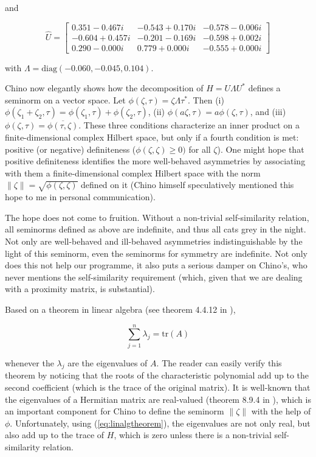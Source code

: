 \documentclass[11pt]{article}
\begin{document}
and

\begin{equation}
  \label{eq:dklu}
\hat{U}=\left[
      \begin{array}{ccc}
   0.351 - 0.467i & -0.543 + 0.170i & -0.578 - 0.006i \\
  -0.604 + 0.457i & -0.201 - 0.169i & -0.598 + 0.002i \\
   0.290 - 0.000i &  0.779 + 0.000i & -0.555 + 0.000i
      \end{array}
\right]
\end{equation}

with $\Lambda=\mbox{diag}(-0.060,-0.045,0.104)$. 

Chino now elegantly shows how the decomposition of $H=U\Lambda{}U^{*}$
defines a seminorm on a vector space. Let
$\phi(\zeta,\tau)=\zeta\Lambda\tau^{*}$. Then (i)
$\phi(\zeta_{1}+\zeta_{2},\tau)=\phi(\zeta_{1},\tau)+\phi(\zeta_{2},\tau)$,
(ii) $\phi(a\zeta,\tau)=a\phi(\zeta,\tau)$, and (iii)
$\phi(\zeta,\tau)=\overline{\phi(\tau,\zeta)}$. These three conditions
characterize an inner product on a finite-dimensional complex Hilbert
space, but only if a fourth condition is met: positive (or negative)
definiteness ($\phi(\zeta,\zeta)\geq{}0)$ for all $\zeta$). One might
hope that positive definiteness identifies the more well-behaved
asymmetries by associating with them a finite-dimensional complex
Hilbert space with the norm $\|\zeta\|=\sqrt{\phi(\zeta,\zeta)}$
defined on it (Chino himself speculatively mentioned this hope to me
in personal communication).

The hope does not come to fruition. Without a non-trivial
self-similarity relation, all seminorms defined as above are
indefinite, and thus all cats grey in the night. Not only are
well-behaved and ill-behaved asymmetries indistinguishable by the
light of this seminorm, even the seminorms for symmetry are
indefinite. Not only does this not help our programme, it also puts a
serious damper on Chino's, who never mentions the self-similarity
requirement (which, given that we are dealing with a proximity matrix,
is substantial).

Based on a theorem in linear algebra (see theorem 4.4.12 in
),

\begin{equation}
  \label{eq:linalgtheorem}
    \sum_{j=1}^{n}\lambda_{j}=\mbox{tr}(A)
\end{equation}

whenever the $\lambda_{j}$ are the eigenvalues of $A$. The reader can
easily verify this theorem by noticing that the roots of the
characteristic polynomial add up to the second coefficient (which is
the trace of the original matrix). It is well-known that the
eigenvalues of a Hermitian matrix are real-valued (theorem 8.9.4 in
), which is an important component for Chino
to define the seminorm $\|\zeta\|$ with the help of $\phi$.
Unfortunately, using (\ref{eq:linalgtheorem}), the eigenvalues are not
only real, but also add up to the trace of $H$, which is zero unless
there is a non-trivial self-similarity relation.
\end{document}
